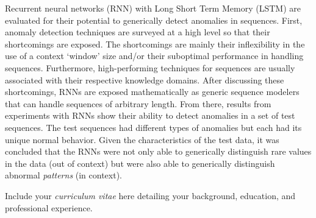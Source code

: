 \documentclass[11 pt]{report}
\begin{document}

\tableofcontents

\listoftables

\listoffigures

\abstractpage

Recurrent neural networks (RNN) with Long Short Term Memory (LSTM) are evaluated for their potential to generically detect anomalies in sequences.
%
First, anomaly detection techniques are surveyed at a high level so that their shortcomings are exposed.
%
The shortcomings are mainly their inflexibility in the use of a context `window' size and/or their suboptimal performance in handling sequences.
%
Furthermore, high-performing techniques for sequences are usually associated with their respective knowledge domains.
%
After discussing these shortcomings, RNNs are exposed mathematically as generic sequence modelers that can handle sequences of arbitrary length.
%
From there, results from experiments with RNNs show their ability to detect anomalies in a set of test sequences.
%
The test sequences had different types of anomalies but each had its unique normal behavior.
%
Given the characteristics of the test data, it was concluded that the RNNs were not only able to generically distinguish rare values in the data (out of context) but were also able to generically distinguish abnormal \emph{patterns} (in context).




\startofchapters









\appendix
\appendixeqnumbering





\cvpage %

\noindent Include your \emph{curriculum vitae} here detailing your background,
education, and professional experience.
\end{document}
